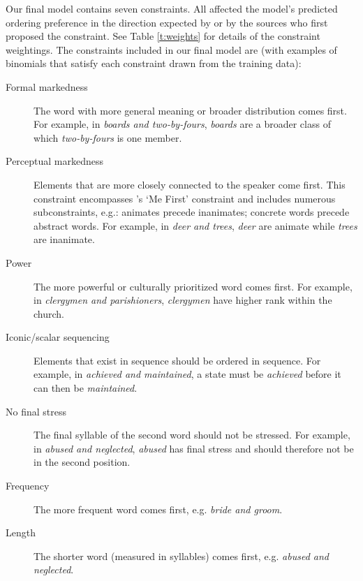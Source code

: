 \documentclass[authoryear]{elsarticle}
\begin{document}
Our final model contains seven constraints. All affected the model's predicted ordering preference in the direction expected by \citeauthor{Benor:2006gv} or by the sources who first proposed the constraint. See Table \ref{t:weights} for details of the constraint weightings.
The constraints included in our final model are (with examples of binomials that satisfy each constraint drawn from the training data):

\begin{description}
  \item[Formal markedness] The word with more general meaning or broader distribution comes first. For example, in \emph{boards and two-by-fours}, \emph{boards} are a broader class of which \emph{two-by-fours} is one member.
  \item[Perceptual markedness] Elements that are more closely connected to the speaker come first. This constraint encompasses \citeauthor{Cooper:1975uz}'s \citeyearpar{Cooper:1975uz} `Me First' constraint and includes numerous subconstraints, e.g.: animates precede inanimates; concrete words precede abstract words. For example, in \emph{deer and trees}, \emph{deer} are animate while \emph{trees} are inanimate.
  \item[Power] The more powerful or culturally prioritized word comes first. For example, in \emph{clergymen and parishioners}, \emph{clergymen} have higher rank within the church.
  \item[Iconic/scalar sequencing] Elements that exist in sequence should be ordered in sequence. For example, in \emph{achieved and maintained}, a state must be \emph{achieved} before it can then be \emph{maintained}.
  \item[No final stress] The final syllable of the second word should not be stressed. For example, in \emph{abused and neglected}, \emph{abused} has final stress and should therefore not be in the second position.
  \item[Frequency] The more frequent word comes first, e.g. \emph{bride and groom}.
  \item[Length] The shorter word (measured in syllables) comes first, e.g. \emph{abused and neglected}.
  
\end{description}
\end{document}
